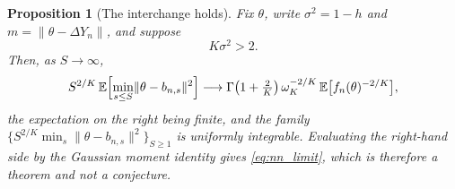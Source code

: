 \documentclass[11pt]{article}
\newtheorem{proposition}[proposition]{Proposition}
\theoremstyle{definition}
\newcommand{\E}{\mathbb{E}}
\begin{document}
\begin{proposition}[The interchange holds]\label{prop:nn_interchange}
Fix $\theta$, write $\sigma^2=1-h$ and $m=\lVert\theta-\Delta Y_n\rVert$, and suppose
\begin{equation}\label{eq:interchange_condition}
K\sigma^2>2 .
\end{equation}
Then, as $S\to\infty$,
\begin{equation}\label{eq:interchange}
S^{2/K}\,\E\Bigl[\min_{s\le S}\lVert\theta-b_{n,s}\rVert^2\Bigr]
\longrightarrow
\Gamma\bigl(1+\tfrac2K\bigr)\,\omega_K^{-2/K}\,\E\bigl[f_n(\theta)^{-2/K}\bigr],
\end{equation}
the expectation on the right being finite, and the family $\{S^{2/K}\min_s\lVert\theta-b_{n,s}\rVert^2\}_{S\ge1}$ is uniformly integrable. Evaluating the right-hand side by the Gaussian moment identity gives \eqref{eq:nn_limit}, which is therefore a theorem and not a conjecture.
\end{proposition}
\end{document}
